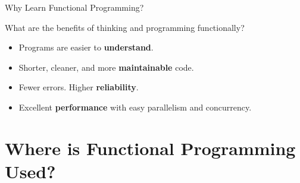 \documentclass[8pt,aspectratio=169]{beamer}
\begin{document}

\begin{frame}{Why Learn Functional Programming?}

\pause
What are the benefits of thinking and programming functionally?
\newline

\begin{itemize}
\item \pause
  Programs are easier to \textbf{understand}.
\item \pause
  Shorter, cleaner, and more \textbf{maintainable} code.
\item \pause
  Fewer errors. Higher \textbf{reliability}.
\item \pause
  Excellent \textbf{performance} with easy parallelism and concurrency.
\end{itemize}

\end{frame}


\section{Where is Functional Programming Used?}

\end{document}
